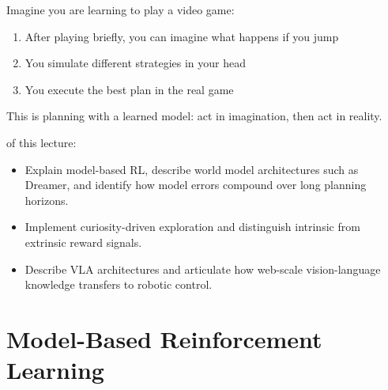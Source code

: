 \begin{marginfigure}
\caption{World model predicts next state and reward, enabling mental simulation.}
\label{fig:world_model_intro}
\end{marginfigure}

Imagine you are learning to play a video game:
\begin{enumerate}
    \item After playing briefly, you can imagine what happens if you jump
    \item You simulate different strategies in your head
    \item You execute the best plan in the real game
\end{enumerate}

This is planning with a learned model: act in imagination, then act in reality.

 of this lecture:
\begin{itemize}
    \item Explain model-based RL, describe world model architectures such as Dreamer, and identify how model errors compound over long planning horizons.
    \item Implement curiosity-driven exploration and distinguish intrinsic from extrinsic reward signals.
    \item Describe VLA architectures and articulate how web-scale vision-language knowledge transfers to robotic control.
\end{itemize}


\newpage
\section{Model-Based Reinforcement Learning}


